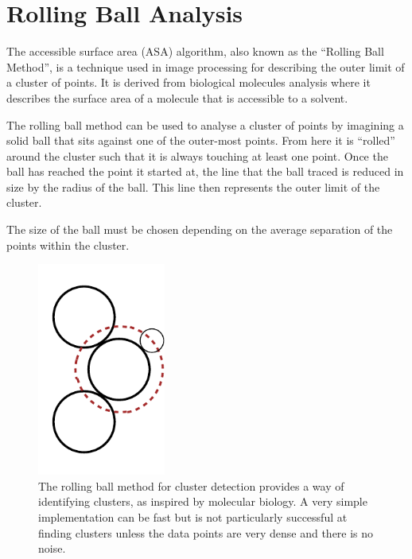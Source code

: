 
\section{Rolling Ball Analysis}
\label{sec:rolling_ball_analysis}

The accessible surface area (ASA) algorithm, also known as the ``Rolling Ball
Method'', is a technique used in image processing for describing the outer
limit of a cluster of points. It is derived from biological molecules analysis
where it describes the surface area of a molecule that is accessible to a
solvent.

The rolling ball method can be used to analyse a cluster of points by imagining
a solid ball that sits against one of the outer-most points. From here it is
``rolled'' around the cluster such that it is always touching at least one
point. Once the ball has reached the point it started at, the line that the ball
traced is reduced in size by the radius of the ball. This line then represents
the outer limit of the cluster.

The size of the ball must be chosen depending on the average separation of the
points within the cluster.

\begin{figure}[tbhp]
	\centering
	\includegraphics[width=4.2cm]{rolling-ball.pdf}

	\caption[Rolling ball method for cluster detection.]{The rolling ball
		method for cluster detection provides a way of identifying clusters, as
		inspired by molecular biology. A very simple implementation can be fast
		but is not particularly successful at finding clusters unless the data
		points are very dense and there is no noise.}\label{fig:rolling-ball}
\end{figure}

